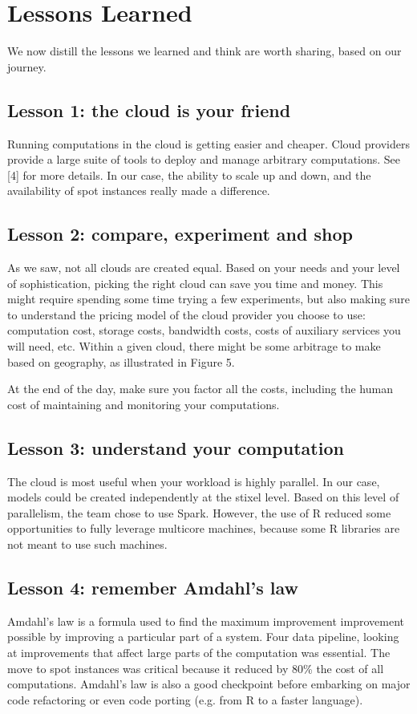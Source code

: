 \documentclass{acm_proc_article-sp}
\begin{document}
\section{Lessons Learned}
We now distill the lessons we learned and think are worth sharing, based on our journey.

\subsection*{Lesson 1: the cloud is your friend}
Running computations in the cloud is getting easier and cheaper. Cloud providers provide a large suite of tools to deploy and manage arbitrary computations. See [4] for more details. In our case, the ability to scale up and down, and the availability of spot instances really made a difference.
 
\subsection*{Lesson 2: compare, experiment and shop}
As we saw, not all clouds are created equal. Based on your needs and your level of sophistication, picking the right cloud can save you time and money. This might require spending some time trying a few experiments, but also making sure to understand  the pricing model of the cloud provider you choose to use: computation cost, storage costs, bandwidth costs, costs of auxiliary services you will need, etc. Within a given cloud, there might be some arbitrage to make based on geography, as illustrated in Figure 5.

At the end of the day, make sure you factor all the costs, including the human cost of maintaining and monitoring your computations.

\subsection*{Lesson 3: understand your computation}
The cloud is most useful when your workload is highly parallel. In our case, models could be created independently at the stixel level. Based on this level of parallelism, the team chose to use Spark. However, the use of R reduced some opportunities to fully leverage multicore machines, because some R libraries are not meant to use such machines.

\subsection*{Lesson 4: remember Amdahl's law}
Amdahl's law is a formula used to find the maximum improvement improvement possible by improving a particular part of a system. Four data pipeline, looking at improvements that affect large parts of the computation was essential. The move to spot instances was critical because it reduced by 80\% the cost of all computations. Amdahl's law is also a good checkpoint before embarking on  major code refactoring or even code porting (e.g. from R to a faster language). 
\end{document}
